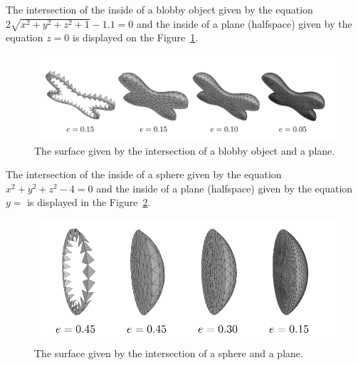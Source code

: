 The intersection of the inside of a blobby object given by the equation
\newline
$2\sqrt{x^2+y^2+z^2+1}-1.1=0$ 
and the inside of a plane (halfspace) given by the 
equation $z=0$ is displayed on the Figure~\ref{img:74}.
\begin{figure}[h!]
    \centerline{\includegraphics[scale=0.5]{images/img74}}
    \caption[The surface given by the intersection of a blobby object and a plane]
    {The surface given by the intersection of a blobby object and a plane.}
    \label{img:74}
\end{figure}

The intersection of the inside of a sphere given by the equation
$x^2+y^2+z^2-4=0$ and the inside of a plane (halfspace) given by the 
equation $y=$ is displayed in the Figure~\ref{img:72}.
\begin{figure}[h!]
    \centerline{\includegraphics[scale=0.5]{images/img72}}
    \caption[The surface given by the intersection of a sphere and a plane]
    {The surface given by the intersection of a sphere and a plane.}
    \label{img:72}
\end{figure}

